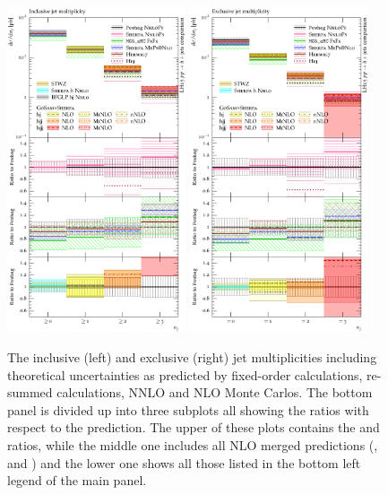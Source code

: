 \begin{figure}[t!]
  \centering
  \includegraphics[width=0.47\textwidth]{figures/hjetscomp_NJet_incl_30.pdf}
  \hfill
  \includegraphics[width=0.47\textwidth]{figures/hjetscomp_NJet_excl_30.pdf}
  \caption{\label{fig:higgscomp:results:inclobs:njets}%
    The inclusive (left) and exclusive (right) jet multiplicities
    including theoretical uncertainties as predicted by fixed-order
    calculations, re-summed calculations, NNLO and NLO Monte Carlos. The
    bottom panel is divided up into three subplots all showing the
    ratios with respect to the \Powheg \NNLOPS prediction. The upper of these plots
    contains the \Hej and \Sherpa \NNLOPS ratios, while the middle one
    includes all NLO merged predictions (\MGaMC, \Herwig and \Sherpa)
    and the lower one shows all those listed in the bottom left legend
    of the main panel.}
\end{figure}

